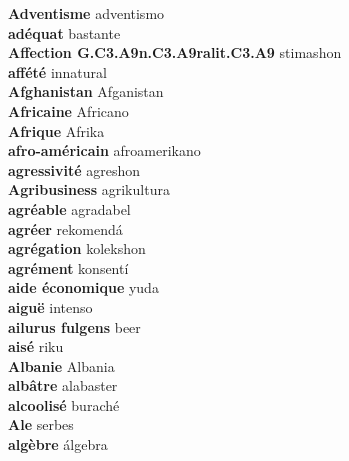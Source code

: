 \textbf{ Adventisme  } adventismo \\
\textbf{ adéquat  } bastante \\
\textbf{ Affection G.C3.A9n.C3.A9ralit.C3.A9  } stimashon \\
\textbf{ affété  } innatural \\
\textbf{ Afghanistan  } Afganistan \\
\textbf{ Africaine  } Africano \\
\textbf{ Afrique  } Afrika \\
\textbf{ afro-américain  } afroamerikano \\
\textbf{ agressivité  } agreshon \\
\textbf{ Agribusiness  } agrikultura \\
\textbf{ agréable  } agradabel \\
\textbf{ agréer  } rekomendá \\
\textbf{ agrégation  } kolekshon \\
\textbf{ agrément  } konsentí \\
\textbf{ aide économique  } yuda \\
\textbf{ aiguë  } intenso \\
\textbf{ ailurus fulgens  } beer \\
\textbf{ aisé  } riku \\
\textbf{ Albanie  } Albania \\
\textbf{ albâtre  } alabaster \\
\textbf{ alcoolisé  } buraché \\
\textbf{ Ale  } serbes \\
\textbf{ algèbre  } álgebra \\
